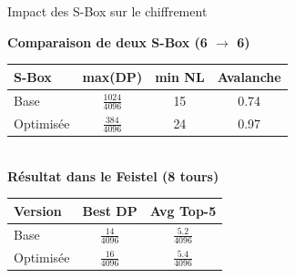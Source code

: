\begin{frame}{Impact des S-Box sur le chiffrement}

\begin{center}

\textbf{Comparaison de deux S-Box (6 $\rightarrow$ 6)}

\vspace{0.2cm}

\renewcommand{\arraystretch}{1.4} %

\begin{tabular}{lccc}
\toprule
\textbf{S-Box} & \textbf{max(DP)} & \textbf{min NL} & \textbf{Avalanche} \\
\midrule
Base & $\frac{1024}{4096}$ & 15 & 0.74 \\
\vspace{0.2cm}
Optimisée & $\frac{384}{4096}$ & 24 & 0.97 \\
\bottomrule
\end{tabular}
\vspace{0.2cm}\\

\textbf{Résultat dans le Feistel (8 tours)}


\begin{tabular}{lcc}
\toprule
\textbf{Version} & \textbf{Best DP} & \textbf{Avg Top-5} \\
\midrule
Base & $\frac{14}{4096}$ & $\frac{5.2}{4096}$ \\
\vspace{0.2cm}
Optimisée & $\frac{16}{4096}$ & $\frac{5.4}{4096}$ \\
\bottomrule
\end{tabular}


\end{center}

\end{frame}

